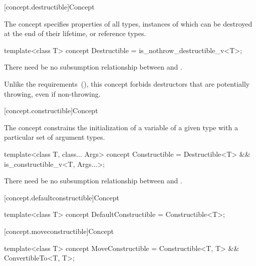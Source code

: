 [concept.destructible]{Concept }

\pnum
The  concept specifies properties of all types,
instances of which can be destroyed at the end of their lifetime, or reference
types.

%
\begin{itemdecl}
template<class T>
concept Destructible = is_nothrow_destructible_v<T>;
\end{itemdecl}

\begin{itemdescr}
\pnum
There need be no subsumption relationship between
and
.

\pnum
\begin{note}
Unlike the  requirements~(), this
concept forbids destructors that are potentially throwing, even if non-throwing.
\end{note}
\end{itemdescr}

[concept.constructible]{Concept }

\pnum
The  concept constrains the initialization of a
variable of a given type with a particular set of argument types.

%
\begin{itemdecl}
template<class T, class... Args>
concept Constructible = Destructible<T> && is_constructible_v<T, Args...>;
\end{itemdecl}

\begin{itemdescr}
\pnum
There need be no subsumption relationship between
and
.
\end{itemdescr}

[concept.defaultconstructible]{Concept }

%
\begin{itemdecl}
template<class T>
concept DefaultConstructible = Constructible<T>;
\end{itemdecl}

[concept.moveconstructible]{Concept }

%
\begin{itemdecl}
template<class T>
concept MoveConstructible = Constructible<T, T> && ConvertibleTo<T, T>;
\end{itemdecl}

